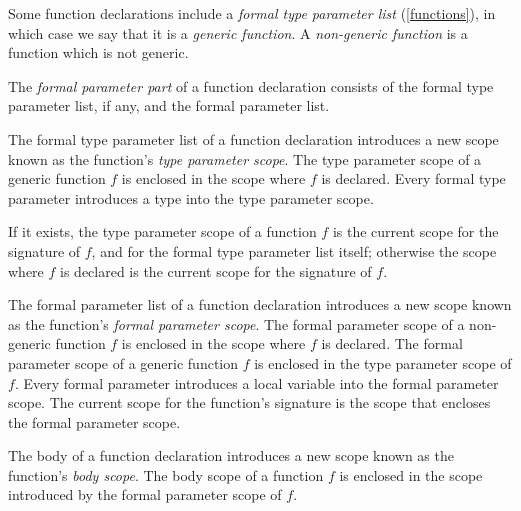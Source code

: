 \documentclass{article}
\begin{document}
\LMHash{}
Some function declarations include a {\em formal type parameter list} (\ref{functions}),
in which case we say that it is a {\em generic function}.
A {\em non-generic function} is a function which is not generic.

\LMHash{}
The {\em formal parameter part} of a function declaration consists of the formal type parameter list, if any, and the formal parameter list.


\LMHash{}
The formal type parameter list of a function declaration introduces a new scope known as the function's {\em type parameter scope}.
The type parameter scope of a generic function $f$ is enclosed in the scope where $f$ is declared.
Every formal type parameter introduces a type into the type parameter scope.

\LMHash{}
If it exists, the type parameter scope of a function $f$ is the current scope for the signature of $f$, and for the formal type parameter list itself;
otherwise the scope where $f$ is declared is the current scope for the signature of $f$.


\LMHash{}
The formal parameter list of a function declaration introduces a new scope known as the function's {\em formal parameter scope}.
The formal parameter scope of a non-generic function $f$ is enclosed in the scope where $f$ is declared.
The formal parameter scope of a generic function $f$ is enclosed in the type parameter scope of $f$.
Every formal parameter introduces a local variable into the formal parameter scope.
The current scope for the function's signature is the scope that encloses the formal parameter scope.


\LMHash{}
The body of a function declaration introduces a new scope known as the function's {\em body scope}.
The body scope of a function $f$ is enclosed in the scope introduced by the formal parameter scope of $f$.
\end{document}
